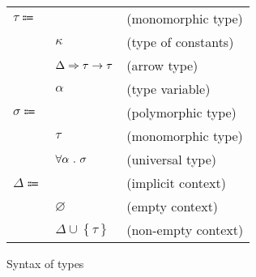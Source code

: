 \documentclass[acmlarge]{acmart}
\begin{document}
  \begin{figure}[h!]
    \begin{mdframed}

      \begin{tabular}{l l l}
        $\tau \Coloneqq $ & & (monomorphic type) \\
        & $\kappa$ & (type of constants) \\
        & $\Delta \Rightarrow \tau \rightarrow \tau$ & (arrow type) \\
        & $\alpha$ & (type variable) \\
        $\sigma \Coloneqq $ & & (polymorphic type) \\
        & $\tau$ & (monomorphic type) \\
        & $\forall \alpha \ . \ \sigma$ & (universal type) \\
        $\Delta \Coloneqq $ & & (implicit context) \\
        & $\varnothing$ & (empty context) \\
        & $\Delta \cup \left\{ \tau \right\}$ & (non-empty context)
      \end{tabular}

    \end{mdframed}
    \caption{Syntax of types}
    \label{fig:types_syntax}
  \end{figure}
\end{document}
